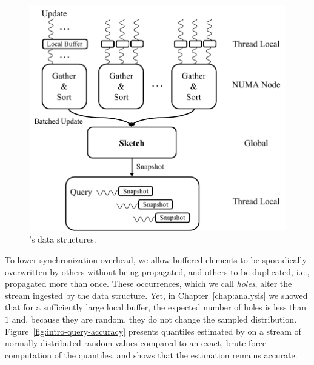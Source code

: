 \begin{figure}[htp]
    \centering
        \includegraphics[width=0.8\linewidth,trim={0cm 0cm 0cm 0.3cm},clip]{graphics/algorithm/Quancurrent_structure_intro.pdf}
    \caption{\mysketch's data structures.}
    \label{fig:quancurrentDS}
\end{figure}


To lower synchronization overhead, we allow buffered elements to be sporadically overwritten by others without being propagated, and others to be duplicated, i.e., propagated more than once. These occurrences, which we call \emph{holes}, alter the stream ingested by the data structure. 
Yet, in Chapter~\ref{chap:analysis} we showed that for a sufficiently large local buffer, the expected number of holes is less than $1$ and, because they are random, they do not change the sampled distribution.
Figure~\ref{fig:intro-query-accuracy} presents quantiles estimated by \mysketch on a stream of normally distributed random values compared to an exact, brute-force computation of the quantiles, and shows that the estimation remains accurate.

